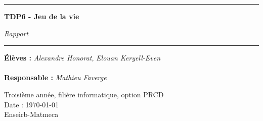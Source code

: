 \thispagestyle{empty}


%
\hrule
\begin{flushleft}
\Huge{\textbf{TDP6 - Jeu de la vie}}\\
\end{flushleft}
\begin{flushright}
\huge\textit{Rapport}\\
\end{flushright}
\hrule

\vspace{80pt}
\noindent\textbf{Élèves :}
\emph{Alexandre Honorat}, \emph{Elouan Keryell-Even}\\
\\
\noindent\textbf{Responsable :}
\emph{Mathieu Faverge}\\


\vspace{60pt}
\normalsize
\begin{center}
  Troisième année, filière informatique, option PRCD\\
  Date : \today\\
  Enseirb-Matmeca
\end{center}
\vspace{50pt}
